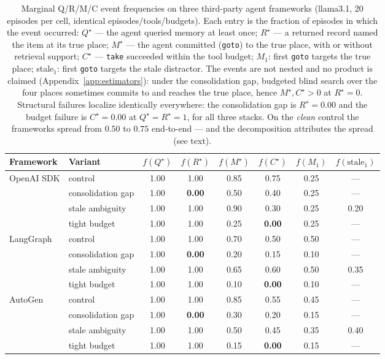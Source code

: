 \documentclass{article}
\newcommand{\method}[1]{\texttt{#1}}
\begin{document}
\begin{table}[h]
\caption{Marginal Q/R/M/C event frequencies on three third-party
agent frameworks (llama3.1, 20 episodes per cell, identical
episodes/tools/budgets). Each entry is the fraction of episodes in
which the event occurred: $Q^\star$ --- the agent queried memory at
least once; $R^\star$ --- a returned record named the item at its
true place; $M^\star$ --- the agent committed (\method{goto}) to the
true place, with or without retrieval support; $C^\star$ ---
\method{take} succeeded within the tool budget; $M_1$: first
\method{goto} targets the true place; stale$_1$: first \method{goto}
targets the stale distractor. The events are not nested and no
product is claimed (Appendix~\ref{app:estimators}): under the
consolidation gap, budgeted blind search over the four places
sometimes commits to and reaches the true place, hence
$M^\star, C^\star > 0$ at $R^\star{=}0$. Structural failures localize
identically everywhere: the consolidation gap is $R^\star{=}0.00$ and
the budget failure is $C^\star{=}0.00$ at $Q^\star{=}R^\star{=}1$,
for all three stacks. On the \emph{clean} control the frameworks
spread from $0.50$ to $0.75$ end-to-end --- and the decomposition
attributes the spread (see text).}
\label{tab:external}
\centering
\small
\begin{tabular}{llcccccc}
\toprule
Framework & Variant & $f(Q^\star)$ & $f(R^\star)$ & $f(M^\star)$ & $f(C^\star)$ & $f(M_1)$ & $f(\text{stale}_1)$ \\
\midrule
OpenAI SDK & control     & 1.00 & 1.00 & 0.85 & 0.75 & 0.25 & --- \\
           & consolidation gap & 1.00 & \textbf{0.00} & 0.50 & 0.40 & 0.25 & --- \\
           & stale ambiguity   & 1.00 & 1.00 & 0.90 & 0.30 & 0.25 & 0.20 \\
           & tight budget      & 1.00 & 1.00 & 0.25 & \textbf{0.00} & 0.25 & --- \\
\midrule
LangGraph  & control     & 1.00 & 1.00 & 0.70 & 0.50 & 0.50 & --- \\
           & consolidation gap & 1.00 & \textbf{0.00} & 0.20 & 0.15 & 0.10 & --- \\
           & stale ambiguity   & 1.00 & 1.00 & 0.65 & 0.60 & 0.50 & 0.35 \\
           & tight budget      & 1.00 & 1.00 & 0.10 & \textbf{0.00} & 0.10 & --- \\
\midrule
AutoGen    & control     & 1.00 & 1.00 & 0.85 & 0.55 & 0.45 & --- \\
           & consolidation gap & 1.00 & \textbf{0.00} & 0.30 & 0.20 & 0.15 & --- \\
           & stale ambiguity   & 1.00 & 1.00 & 0.50 & 0.45 & 0.35 & 0.40 \\
           & tight budget      & 1.00 & 1.00 & 0.15 & \textbf{0.00} & 0.15 & --- \\
\bottomrule
\end{tabular}
\end{table}
\end{document}
